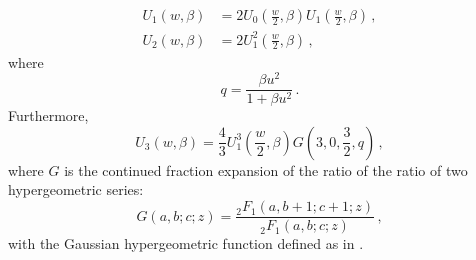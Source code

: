 \begin{align}
U_1(w,\beta) &= 2U_0\left(\frac{w}{2},\beta\right)U_1\left(\frac{w}{2},\beta\right) \,, \\
U_2(w,\beta) &= 2U_1^2\left(\frac{w}{2},\beta\right) \,,
\end{align}
where
\begin{equation}
q = \frac{\beta u^2}{1 + \beta u^2} \,.
\end{equation}
Furthermore, 
\begin{equation}
U_3(w,\beta) = \frac{4}{3} U_1^3\left(\frac{w}{2},\beta\right) G(3,0,\frac{3}{2},q) \,,
\end{equation}
where $G$ is the continued fraction expansion of the ratio of the ratio of two hypergeometric series:
\begin{equation}
G(a,b;c;z) = \frac{{}_2F_1(a,b+1;c+1;z)}{{}_2F_1(a,b;c;z)} \,,
\end{equation}
with the Gaussian hypergeometric function defined as in .

